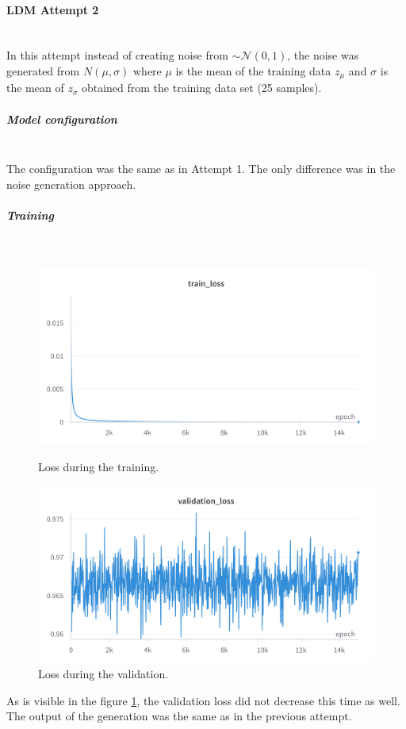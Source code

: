 
\paragraph{LDM Attempt 2}\mbox{}\\

\indent In this attempt instead of creating noise from $\sim\mathcal{N}(0,1)$, the noise was generated from $N(\mu, \sigma)$ where $\mu$ is the mean of the training data $z_{\mu}$ and $\sigma$ is the mean of $z_{\sigma}$ obtained from the training data set (25 samples).

\subparagraph{Model configuration}\mbox{}\\
The configuration was the same as in Attempt 1. The only difference was in the noise generation approach.

\subparagraph{Training}\mbox{}\\
\begin{figure}[H]
\includegraphics[width=\linewidth]{detailed_engineering/Monai Diffusion - Attempt 2/charts/train_loss.png}
\caption{Loss during the training.}
\endminipage\hfill
{}
\includegraphics[width=\linewidth]{detailed_engineering/Monai Diffusion - Attempt 2/charts/validation_loss.png}
\caption{Loss during the validation.}
\label{fig:ldm_a2_val_loss}
\endminipage
\end{figure}

As is visible in the figure \ref{fig:ldm_a2_val_loss}, the validation loss did not decrease this time as well. The output of the generation was the same as in the previous attempt.


